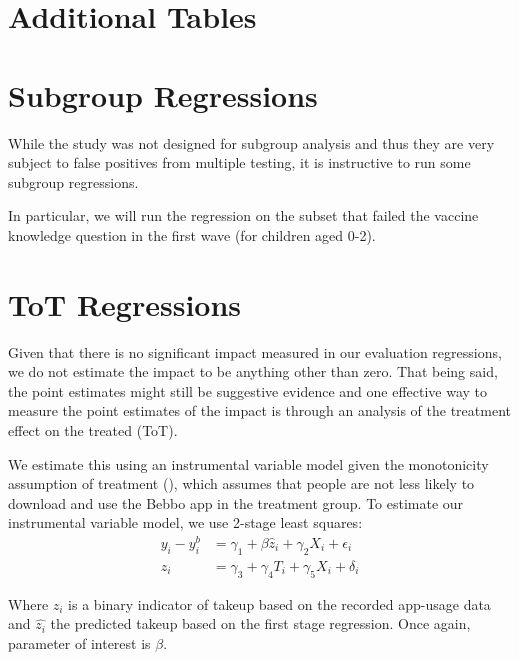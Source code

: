 \documentclass{article}
\begin{document}
\section{Additional Tables}







\section{Subgroup Regressions}

While the study was not designed for subgroup analysis and thus they are very subject to false positives from multiple testing, it is instructive to run some subgroup regressions.

In particular, we will run the regression on the subset that failed the vaccine knowledge question in the first wave (for children aged 0-2).



\section{ToT Regressions}

Given that there is no significant impact measured in our evaluation regressions, we do not estimate the impact to be anything other than zero. That being said, the point estimates might still be suggestive evidence and one effective way to measure the point estimates of the impact is through an analysis of the treatment effect on the treated (ToT).

We estimate this using an instrumental variable model given the monotonicity assumption of treatment (\cite{Imbens2015}), which assumes that people are not less likely to download and use the Bebbo app in the treatment group. To estimate our instrumental variable model, we use 2-stage least squares:
\begin{align*}
y_{i} - y^{b}_i &= \gamma_1 + \beta \hat{z}_{i} + \gamma_2X_{i} + \epsilon_i \\
z_{i} &= \gamma_3 + \gamma_4 T_{i} + \gamma_5X_{i} + \delta_i
\end{align*}

Where $z_i$ is a binary indicator of takeup based on the recorded app-usage data and $\hat{z_i}$ the predicted takeup based on the first stage regression. Once again, parameter of interest is $\beta$.
\end{document}
